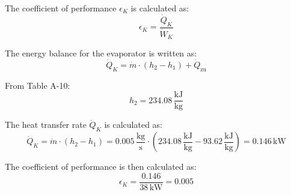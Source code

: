 The coefficient of performance \( \epsilon_K \) is calculated as:  
\[
\epsilon_K = \frac{\dot{Q}_K}{\dot{W}_K}
\]  

The energy balance for the evaporator is written as:  
\[
\dot{Q}_K = \dot{m} \cdot (h_2 - h_1) + \dot{Q}_{\text{zu}}
\]  

From Table A-10:  
\[
h_2 = 234.08 \, \frac{\text{kJ}}{\text{kg}}
\]  

The heat transfer rate \( \dot{Q}_K \) is calculated as:  
\[
\dot{Q}_K = \dot{m} \cdot (h_2 - h_1) = 0.005 \, \frac{\text{kg}}{\text{s}} \cdot (234.08 \, \frac{\text{kJ}}{\text{kg}} - 93.62 \, \frac{\text{kJ}}{\text{kg}}) = 0.146 \, \text{kW}
\]  

The coefficient of performance is then calculated as:  
\[
\epsilon_K = \frac{0.146}{38 \, \text{kW}} = 0.005
\]